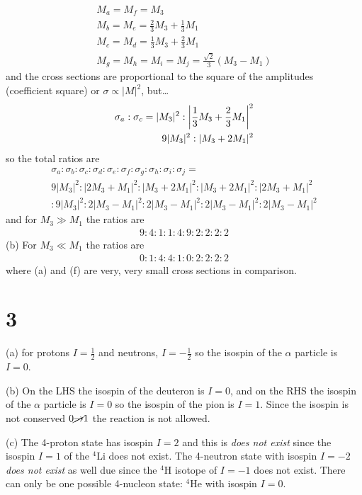 \documentclass[../main.tex]{subfiles}
\newcommand{\ohf}{\frac{1}{2}}
\begin{document}
\begin{align*}
    M_a = M_f = M_3 \\
    M_b = M_e = \frac{2}{3} M_3 + \frac{1}{3} M_1 \\
    M_c = M_d = \frac{1}{3} M_3 + \frac{2}{3} M_1 \\
    M_g = M_h = M_i = M_j = \frac{\sqrt{2}}{3} (M_3 - M_1)
\end{align*}
and the cross sections are proportional to the square of the amplitudes (coefficient square) or 
$\sigma \propto |M|^2$, but\dots
\begin{align*}
    \sigma_a : \sigma_c = |M_3|^2 : \abs{\frac{1}{3}M_3 + \frac{2}{3} M_1}^2 \\
    9 |M_3|^2 : |M_3 + 2 M_1|^2
\end{align*}
so the total ratios are
\begin{align*}
    \sigma_a : \sigma_b : \sigma_c : \sigma_d : \sigma_e :
        \sigma_f : \sigma_g : \sigma_h : \sigma_i : \sigma_j = \\
    9|M_3|^2 : |2M_3 + M_1|^2 : |M_3 + 2M_1|^2 : |M_3 + 2M_1|^2 : |2M_3 + M_1|^2 \\
    :  9|M_3|^2 : 2|M_3 - M_1|^2 : 2|M_3 - M_1|^2 : 2|M_3 - M_1|^2 : 2|M_3 - M_1|^2
\end{align*}
and for $M_3 \gg M_1$ the ratios are
\begin{align*}
    \boxed{9 : 4 : 1 : 1 : 4 : 9 : 2 : 2 : 2 : 2}
\end{align*}
(b) For $M_3 \ll M_1$ the ratios are
\begin{align*}
    \boxed{0 : 1 : 4 : 4 : 1 : 0 : 2 : 2 : 2 : 2}
\end{align*}
where (a) and (f) are very, very small cross sections in comparison.
\section*{3}
(a) for protons $I = \ohf$ and neutrons, $I = -\ohf$ so the isospin of the $\alpha$ particle is
$I = 0$.

(b) On the LHS the isospin of the deuteron is $I = 0$, and on the RHS the isospin of the $\alpha$
particle is $I = 0$ so the isospin of the pion is $I = 1$. Since the isospin is not conserved $0 \cancel \to 1$ 
the reaction is not allowed.

(c) The 4-proton state has isospin $I = 2$ and this is \emph{does not exist} since the isospin $I=1$ of the
$^4$Li does not exist. The 4-neutron state with isospin $I = -2$ \emph{does not exist} as well due 
since the $^4$H isotope of $I = -1$ does not exist. There can only be one possible 4-nucleon state:
$^4$He with isospin $I = 0$.
\end{document}
